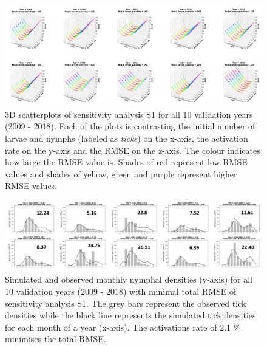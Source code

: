 \documentclass[a4paper, 11pt]{scrartcl}
\begin{document}
\begin{figure}
\centering
\includegraphics[width=\linewidth]{figures/initial_ticks_with_beech_error.png}
\caption{3D scatterplots of sensitivity analysis S1 for all 10 validation years (2009 - 2018). Each of the plots is contrasting the initial number of larvae and nymphs
(labeled as \textit{ticks}) on the x-axis, the activation rate on the y-axis and the RMSE on the z-axis. The colour indicates how large the RMSE value is. Shades of red
represent low RMSE values and shades of yellow, green and purple represent higher RMSE values.}
\label{fig:initial_ticks_with_beech_error_rotated}
\end{figure}

\begin{figure}
\centering
\includegraphics[width=\linewidth]{figures/initial_ticks_with_beech.png}
\caption{Simulated and observed monthly nymphal densities (y-axis) for all 10 validation years (2009 - 2018) with minimal total RMSE of sensitivity analysis S1. The grey bars
represent the observed tick densities while the black line represents the simulated tick densities for each month of a year (x-axis). The activations rate of 2.1 \% minimises
the total RMSE.}
\label{fig:initial_ticks_with_beech_rotated}
\end{figure}
\end{document}

